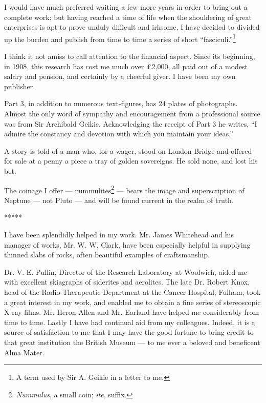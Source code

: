 \documentclass[a4paper, 12pt, oneside]{article}
\begin{document}
I would have much preferred waiting a few more years in order to bring out a complete work; but having reached a time of life when the shouldering of great enterprises is apt to prove unduly difficult and irksome, I have decided to divided up the burden and publish from time to time a series of short ``fasciculi.''\footnote{A term used by Sir A. Geikie in a letter to me.}

I think it not amiss to call attention to the financial aspect. Since its beginning, in 1908, this research has cost me much over £2,000, all paid out of a modest salary and pension, and certainly by a cheerful giver. I have been my own publisher.

Part 3, in addition to numerous text-figures, has 24 plates of photographs. Almost the only word of sympathy and encouragement from a professional source was from Sir Archibald Geikie. Acknowledging the receipt of Part 3 he writes, ``I admire the constancy and devotion with which you maintain your ideas.''

A story is told of a man who, for a wager, stood on London Bridge and offered for sale at a penny a piece a tray of golden sovereigns. He sold none, and lost his bet.

The coinage I offer --- nummulites\footnote{\emph{Nummulus}, a small coin; \emph{ite}, suffix.} --- bears the image and superscription of Neptune --- not Pluto --- and will be found current in the realm of truth.

\centerline{*\hspace{15mm}*\hspace{15mm}*\hspace{15mm}*\hspace{15mm}*}
\bigskip

I have been splendidly helped in my work. Mr. James Whitehead and his manager of works, Mr. W. W. Clark, have been especially helpful in supplying thinned slabs of rocks, often beautiful examples of craftsmanship.

Dr. V. E. Pullin, Director of the Research Laboratory at Woolwich, aided me with excellent skiagraphs of siderites and aerolites. The late Dr. Robert Knox, head of the Radio-Therapeutic Department at the Cancer Hospital, Fulham, took a great interest in my work, and enabled me to obtain a fine series of stereoscopic X-ray films. Mr. Heron-Allen and Mr. Earland have helped me considerably from time to time. Lastly I have had continual aid from my colleagues. Indeed, it is a source of satisfaction to me that I may have the good fortune to bring credit to that great institution the British Museum --- to me ever a beloved and beneficent Alma Mater.
\clearpage
\end{document}
